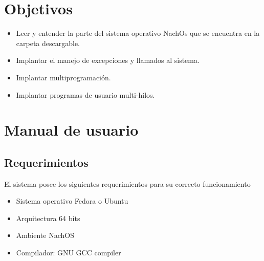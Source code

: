 \documentclass[12pt]{article}
\begin{document}


\section[Objetivos]{Objetivos}
\begin{itemize}
  \item    Leer y entender la parte del sistema operativo NachOs que se encuentra en la carpeta descargable.
  \item    Implantar el manejo de excepciones y llamados al sistema. 
  \item    Implantar multiprogramación. 
  \item    Implantar programas de usuario multi-hilos.
\end{itemize}



 




\newpage
\section[Manual de usuario]{Manual de usuario}
\subsection{Requerimientos}
El sistema posee los siguientes requerimientos para su correcto funcionamiento
\begin{itemize}
  \item Sistema operativo Fedora o Ubuntu
  \item Arquitectura 64 bits
  \item Ambiente NachOS 
  \item Compilador: GNU GCC compiler
\end{itemize}
\end{document}
